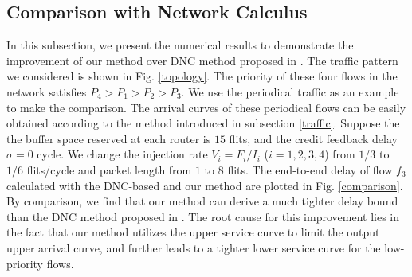 \documentclass[preprint]{elsarticle}
\begin{document}
\subsection{Comparison with Network Calculus}\label{dnccmp}
In this subsection, we present the numerical results to demonstrate the improvement of our method over DNC method proposed in \cite{Qian489900}. The traffic pattern we considered is shown in Fig. \ref{topology}. The priority of these four flows in the network satisfies $P_4>P_1>P_2>P_3$. We use the periodical traffic as an example to make the comparison. The arrival curves of these periodical flows can be easily obtained according to the method introduced in subsection \ref{traffic}. Suppose the the buffer space reserved at each router is $15$ flits, and the credit feedback delay $\sigma=0$ cycle. We change the injection rate $V_i=F_i/I_i$ ($i=1,2,3,4$) from $1/3$ to $1/6$ flits/cycle and packet length from $1$ to $8$ flits. The end-to-end delay of flow $f_3$ calculated with the DNC-based and our method are plotted in Fig. \ref{comparison}. By comparison, we find that our method can derive a much tighter delay bound than the DNC method proposed in \cite{Qian489900}. The root cause for this improvement lies in the fact that our method utilizes the upper service curve to limit the output upper arrival curve, and further leads to a tighter lower service curve for the low-priority flows.
\end{document}
